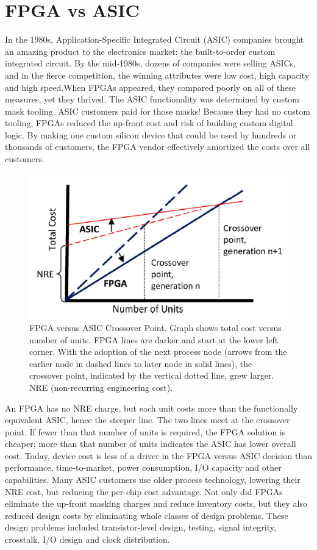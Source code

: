 \section{FPGA vs ASIC}
\noindent In the 1980s, Application-Specific Integrated Circuit
(ASIC) companies brought an amazing product to the
electronics market: the built-to-order custom integrated
circuit. By the mid-1980s, dozens of companies were selling
ASICs, and in the fierce competition, the winning attributes
were low cost, high capacity and high speed.When
FPGAs appeared, they compared poorly on all of these
measures, yet they thrived. The ASIC functionality was determined by custom mask
tooling. ASIC customers paid for those masks!
Because they had no custom tooling, FPGAs reduced the up-front
cost and risk of building custom digital logic. By making
one custom silicon device that could be used by hundreds or
thousands of customers, the FPGA vendor effectively
amortized the costs over all customers.
\begin{figure}[H]
	\centering
	\includegraphics[width=0.7\linewidth]{IMG/ch3/COST}
	\caption{FPGA versus ASIC Crossover Point. Graph shows total cost
		versus number of units. FPGA lines are darker and start at the lower
		left corner. With the adoption of the next process node (arrows
		from the earlier node in dashed lines to later node in solid lines),
		the crossover point, indicated by the vertical dotted line, grew larger.
	\newline NRE (non-recurring engineering cost).}
	\label{fig:cost}
\end{figure}     
\noindent  An FPGA has no NRE charge, but each unit costs more than the
functionally equivalent ASIC, hence the steeper line. The
two lines meet at the crossover point. If fewer than that
number of units is required, the FPGA solution is cheaper;
more than that number of units indicates the ASIC has
lower overall cost.
\newline
Today, device cost is less of a driver in the FPGA
versus ASIC decision than performance, time-to-market,
power consumption, I/O capacity and other capabilities. Many ASIC customers use older process technology,
lowering their NRE cost, but reducing the per-chip cost
advantage. Not only did FPGAs eliminate the up-front masking
charges and reduce inventory costs, but they also reduced
design costs by eliminating whole classes of design problems.
These design problems included transistor-level design,
testing, signal integrity, crosstalk, I/O design and
clock distribution.

